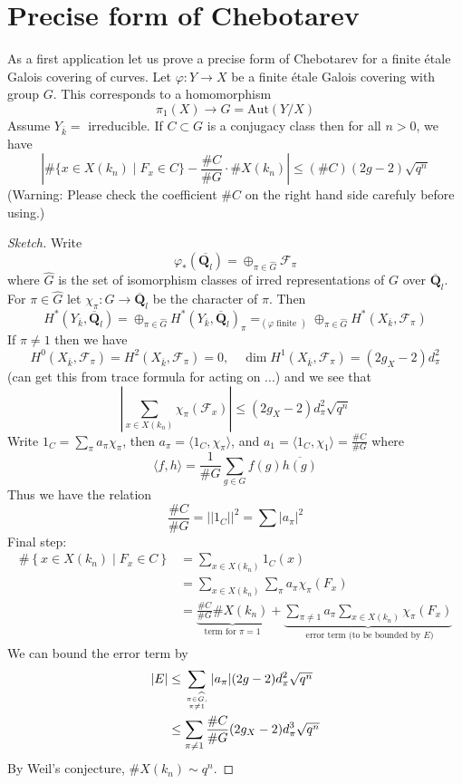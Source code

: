 \section{Precise form of Chebotarev}
\label{section-chebotarev}

\noindent
As a first application let us prove a precise form of Chebotarev
for a finite \'etale Galois covering of curves.
Let $\varphi : Y \to X$ be a finite \'etale Galois covering with
group $G$. This corresponds to a homomorphism
$$
\pi_1(X) \longrightarrow G = \text{Aut}(Y/X)
$$
Assume $Y_{\overline{k}} = $ irreducible. If $C\subset G$ is a conjugacy
class then for all $n>0$, we have
$$
| \# \{x \in X(k_n) \mid F_x \in C\} - \frac{\# C}{\# G} \cdot \# X(k_n) |
\leq
(\# C)(2g - 2) \sqrt{q^n}
$$
(Warning: Please check the coefficient $\# C$ on the right hand side
carefuly before using.)

\begin{proof}[Sketch]
Write
$$
\varphi_*(\overline{\mathbf{Q}_l}) =
\oplus_{\pi \in \widehat{G}} \mathcal{F}_{\pi}
$$
where $\widehat{G}$ is the set of isomorphism
classes of irred representations of
$G$ over $\overline{\mathbf{Q}}_l$. For $\pi \in \widehat{G}$
let $\chi_{\pi}: G \to \overline{\mathbf{Q}}_l$
be the character of $\pi$. Then
$$
H^*(Y_{\overline{k}}, \overline{\mathbf{Q}}_l) =
\oplus_{\pi\in \widehat{G}}
H^*(Y_{\overline{k}}, \overline{\mathbf{Q}}_l)_\pi
=_{(\varphi\text{ finite })}
\oplus_{\pi\in \widehat{G}}
H^*(X_{\overline{k}}, \mathcal{F}_\pi)
$$
If $\pi\neq 1$ then we have
$$
H^0(X_{\overline{k}}, \mathcal{F}_\pi) =
H^2(X_{\overline{k}}, \mathcal{F}_\pi) = 0,\quad
\dim H^1(X_{\overline{k}}, \mathcal{F}_\pi) = (2g_X - 2)d_\pi^2
$$
(can get this from trace formula for acting on ...) and we see that
$$
|\sum_{x \in X(k_n)} \chi_\pi(\mathcal{F}_x)| \leq
(2g_X - 2) d_\pi^2\sqrt{q^n}
$$
Write $1_C = \sum_\pi a_\pi \chi_\pi$, then
$a_\pi = \langle 1_C, \chi_\pi\rangle$, and
$a_1 = \langle 1_C, \chi_1\rangle = \frac{\# C}{\# G}$ where
$$
\langle f, h\rangle = \frac{1}{\# G}\sum_{g \in G} f(g)\overline{h(g)}
$$
Thus we have the relation
$$
\frac{\# C}{\# G} = ||1_C||^2 = \sum|a_\pi|^2
$$
Final step:
\begin{align*}
\#\left\{x \in X(k_n) \mid F_x \in C\right\}
& =
\sum_{x \in X(k_n)} 1_C(x) \\
& =
\sum_{x \in X(k_n)} \sum_\pi a_\pi \chi_\pi(F_x) \\
& =
\underbrace{\frac{\# C}{\# G} \# X(k_n)}_{
\text{term for }\pi = 1}
+
\underbrace{\sum_{\pi\neq 1}a_\pi\sum_{x\in X(k_n)}\chi_\pi(F_x)}_{
\text{ error term (to be bounded by }E)}
\end{align*}
We can bound the error term by
\begin{align*}
|E|
& \leq
\sum_{\pi \in \widehat{G}, \atop \pi \neq 1}
|a_\pi| (2g - 2) d_\pi^2 \sqrt{q^n} \\
& \leq
\sum_{\pi \neq 1} \frac{\# C}{\# G} (2g_X - 2) d_\pi^3 \sqrt{q^n}
\end{align*}
By Weil's conjecture, $\# X(k_n)\sim q^n$.
\end{proof}



